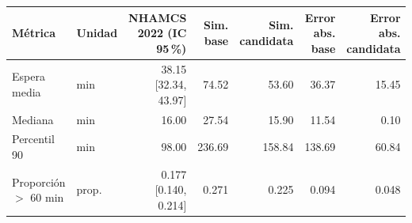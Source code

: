 \begin{tabular}{llrrrrr}
\toprule
Métrica & Unidad & NHAMCS 2022 (IC 95\,\%) & Sim. base & Sim. candidata & Error abs. base & Error abs. candidata \\
\midrule
Espera media & min & 38.15 [32.34, 43.97] & 74.52 & 53.60 & 36.37 & 15.45 \\
Mediana & min & 16.00 & 27.54 & 15.90 & 11.54 & 0.10 \\
Percentil 90 & min & 98.00 & 236.69 & 158.84 & 138.69 & 60.84 \\
Proporción $>$ 60 min & prop. & 0.177 [0.140, 0.214] & 0.271 & 0.225 & 0.094 & 0.048 \\
\bottomrule
\end{tabular}
